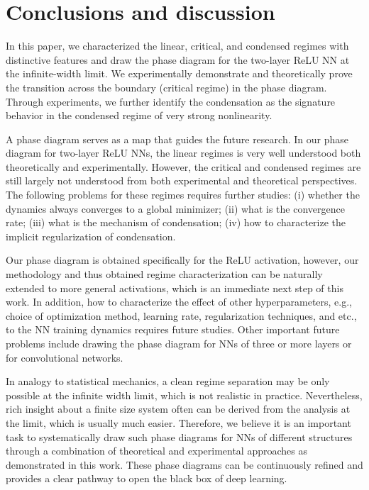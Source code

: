 \documentclass[twoside,11pt]{article}
\begin{document}
\section{Conclusions and discussion}

In this paper, we characterized the linear, critical, and condensed regimes with distinctive features and draw the phase diagram for the two-layer ReLU NN at the infinite-width limit. We experimentally demonstrate and theoretically prove the transition across the boundary (critical regime) in the phase diagram. Through experiments, we further identify the condensation as the signature behavior in the condensed regime of very strong nonlinearity.

A phase diagram serves as a map that guides the future research. In our phase diagram for two-layer ReLU NNs, the linear regimes is very well understood both theoretically and experimentally. However, the critical and condensed regimes are still largely not understood from both experimental and theoretical perspectives. The following problems for these regimes requires further studies: (i) whether the dynamics always converges to a global minimizer; (ii) what is the convergence rate; (iii) what is the mechanism of condensation; (iv) how to characterize the implicit regularization of condensation.

Our phase diagram is obtained specifically for the ReLU activation, however, our methodology and thus obtained regime characterization can be naturally extended to more general activations, which is an immediate next step of this work. In addition, how to characterize the effect of other hyperparameters, e.g., choice of optimization method, learning rate, regularization techniques, and etc., to the NN training dynamics requires future studies. Other important future problems include drawing the phase diagram for NNs of three or more layers or for convolutional networks.

In analogy to statistical mechanics, a clean regime separation may be only possible at the infinite width limit, which is not realistic in practice. Nevertheless, rich insight about a finite size system often can be derived from the analysis at the limit, which is usually much easier. Therefore, we believe it is an important task to systematically draw such phase diagrams for NNs of different structures through a combination of theoretical and experimental approaches as demonstrated in this work. These phase diagrams can be continuously refined and provides a clear pathway to open the black box of deep learning.
\end{document}

